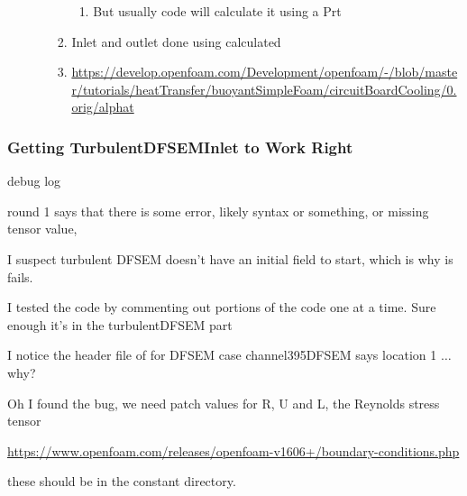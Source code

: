 \documentclass[12pt]{article}
\renewcommand{\_}{\kern-1.5pt\textunderscore\kern-1.5pt}
\begin{document}
\begin{enumerate}
\begin{enumerate}
\begin{enumerate}
\begin{enumerate}
	\item But usually code will calculate it using a Prt\par


\end{enumerate}
	\item Inlet and outlet done using calculated\par

	\item \href{https://develop.openfoam.com/Development/openfoam/-/blob/master/tutorials/heatTransfer/buoyantSimpleFoam/circuitBoardCooling/0.orig/alphat}{https://develop.openfoam.com/Development/openfoam/-/blob/master/tutorials/heatTransfer/buoyantSimpleFoam/circuitBoardCooling/0.orig/alphat}
\end{enumerate}
\end{enumerate}
\end{enumerate}\par
\subsubsection{Getting TurbulentDFSEMInlet to Work Right}
debug log\par

round 1 says that there is some error, likely syntax or something, or missing tensor value,\par

I suspect turbulent DFSEM doesn’t have an initial field to start, which is why is fails.\par

I tested the code by commenting out portions of the code one at a time. Sure enough it’s in the turbulentDFSEM part\par

I notice the header file of for DFSEM case channel395DFSEM says location 1 $ \ldots $  why?\par


\vspace{\baselineskip}
Oh I found the bug, we need patch values for R, U and L, the Reynolds stress tensor\par

\href{https://www.openfoam.com/releases/openfoam-v1606+/boundary-conditions.php}{https://www.openfoam.com/releases/openfoam-v1606+/boundary-conditions.php}\par

these should be in the constant directory.\par
\end{document}
